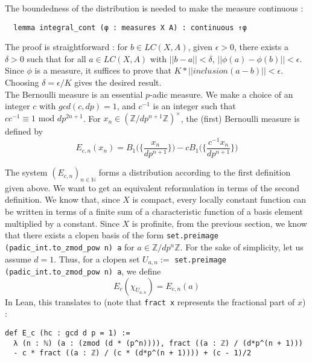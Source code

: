 \documentclass[11pt]{article}
\newcommand{\lean}[1]{\texttt{#1}\xspace} %
\begin{document}
The boundedness of the distribution is needed to make the measure continuous :
\begin{lstlisting}
  lemma integral_cont (φ : measures X A) : continuous ⇑φ
\end{lstlisting}

The proof is straightforward : for $b \in LC(X, A)$, given $\epsilon > 0$, there exists a
$\delta > 0$ such that for all $a \in LC(X, A)$ with $|| b - a || < \delta$,
$|| \phi(a) - \phi(b) || < \epsilon$. Since $\phi$ is a measure, it suffices to prove that
$ K * ||inclusion (a - b)|| < \epsilon $. Choosing $\delta  = \epsilon / K$ gives the desired
result. \\

The Bernoulli measure is an essential $p$-adic measure. We make a choice of an integer $c$ with
$gcd(c,dp) = 1$, and $c^{-1}$ is an integer such that $c c^{-1} \equiv 1 \text{ mod } dp^{2n+1}$.
For $x_n \in (\mathbb{Z} / dp^{n +1} \mathbb{Z})^{\times}$, the (first) Bernoulli measure is defined by
$$ E_{c,n}(x_n) = B_1 \bigg( \bigg\{ \frac{x_n}{dp^{n + 1}} \bigg\} \bigg) -
  cB_1 \bigg( \bigg\{ \frac{c^{-1}x_n}{dp^{n + 1}} \bigg\} \bigg) $$

The system $(E_{c,n})_{n \in \mathbb{N}}$ forms a distribution according to the first definition
given above. We want to get an equivalent reformulation in terms of the second definition.
We know that, since $X$ is compact, every locally constant function can be written in terms of a
finite sum of a characteristic function of a basis element multiplied by a constant. Since $X$ is
profinite, from the previous section, we know that there exists a clopen basis of the form
\lean{set.preimage (padic\_int.to\_zmod\_pow n) {a}} for $a \in\mathbb{Z}/dp^{n} \mathbb{Z}$. 
For the sake of simplicity, let us assume $d = 1$. Thus, for a
clopen set $U_{a,n} := $ \lean{set.preimage (padic\_int.to\_zmod\_pow n) {a}}, we define
$$ E_c (\chi_{U_{a,n}}) = E_{c,n} (a) $$
In Lean, this translates to (note that \lean{fract x} represents the fractional part of $x$) :
\begin{lstlisting}
def E_c (hc : gcd d p = 1) := 
  λ (n : ℕ) (a : (zmod (d * (p^n)))), fract ((a : ℤ) / (d*p^(n + 1))) 
  - c * fract ((a : ℤ) / (c * (d*p^(n + 1)))) + (c - 1)/2
\end{lstlisting}

\end{document}
